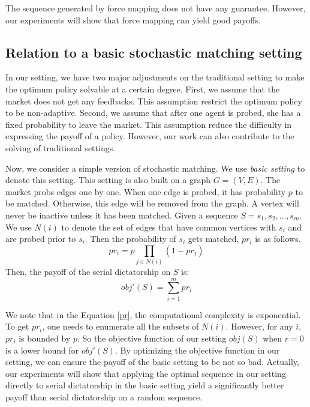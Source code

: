 \documentclass[letterpaper]{article}
\begin{document}
The sequence generated by force mapping does not have any guarantee.
However, our experiments will show that force mapping can yield good payoffs.

\subsection{Relation to a basic stochastic matching setting}\label{sec:basic}

In our setting, we have two major adjustments on the traditional setting to make the optimum policy solvable at a certain degree.
First, we assume that the market does not get any feedbacks.
This assumption restrict the optimum policy to be non-adaptive.
Second, we assume that after one agent is probed, she has a fixed probability to leave the market.
This assumption reduce the difficulty in expressing the payoff of a policy.
However, our work can also contribute to the solving of traditional settings.

Now, we consider a simple version of stochastic matching.
We use \textit{basic setting} to denote this setting.
This setting is also built on a graph $G=(V,E)$.
The market probs edges one by one.
When one edge is probed, it has probability $p$ to be matched.
Otherwise, this edge will be removed from the graph.
A vertex will never be inactive unless it has been matched.
Given a sequence $S=s_1,s_2,\ldots,s_m$.
We use $N(i)$ to denote the set of edges that have common vertices with $s_i$ and are probed prior to $s_i$.
Then the probability of $s_i$ gets matched, $pr_i$ is as follows.
\begin{equation}
pr_i=p\prod_{j\in N(i)}(1-pr_j)\label{pr}
\end{equation}
Then, the payoff of the serial dictatorship on $S$ is:
\begin{equation}
obj'(S)=\sum_{i=1}^m pr_i
\end{equation}

We note that in the Equation \ref{pr}, the computational complexity is exponential.
To get $pr_i$, one needs to enumerate all the subsets of $N(i)$.
However, for any $i$, $pr_i$ is bounded by $p$.
So the objective function of our setting $obj(S)$ when $r=0$ is a lower bound for $obj'(S)$.
By optimizing the objective function in our setting, we can ensure the payoff of the basic setting to be not so bad.
Actually, our experiments will show that applying the optimal sequence in our setting directly to serial dictatorship in the basic setting yield a significantly better payoff than serial dictatorship on a random sequence. 
 
\end{document}
